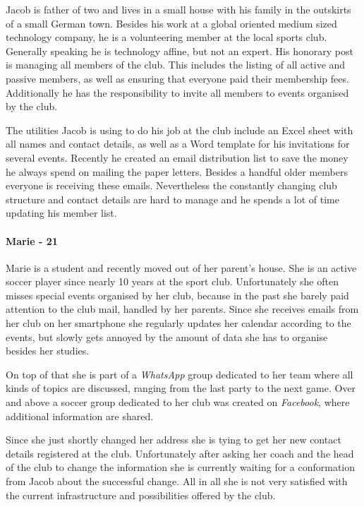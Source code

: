 Jacob is father of two and lives in a small house with his family in the outskirts of a small German town. Besides his work at a global oriented medium sized technology company, he is a volunteering member at the local sports club. Generally speaking he is technology affine, but not an expert. His honorary post is managing all members of the club. This includes the listing of all active and passive members, as well as ensuring that everyone paid their membership fees. Additionally he has the responsibility to invite all members to events organised by the club. 

The utilities Jacob is using to do his job at the club include an Excel sheet with all names and contact details, as well as a Word template for his invitations for several events. Recently he created an email distribution list to save the money he always spend on mailing the paper letters. Besides a handful older members everyone is receiving these emails. Nevertheless the constantly changing club structure and contact details are hard to manage and he spends a lot of time updating his member list.

\paragraph{Marie - 21}
Marie is a student and recently moved out of her parent's house. She is an active soccer player since nearly 10 years at the sport club. Unfortunately she often misses special events organised by her club, because in the past she barely paid attention to the club mail, handled by her parents. Since she receives emails from her club on her smartphone she regularly updates her calendar according to the events, but slowly gets annoyed by the amount of data she has to organise besides her studies.

On top of that she is part of a \emph{WhatsApp} group dedicated to her team where all kinds of topics are discussed, ranging from the last party to the next game. Over and above a soccer group dedicated to her club was created on \emph{Facebook}, where additional information are shared.

Since she just shortly changed her address she is tying to get her new contact details registered at the club. Unfortunately after asking her coach and the head of the club to change the information she is currently waiting for a conformation from Jacob about the successful change. All in all she is not very satisfied with the current infrastructure and possibilities offered by the club.

